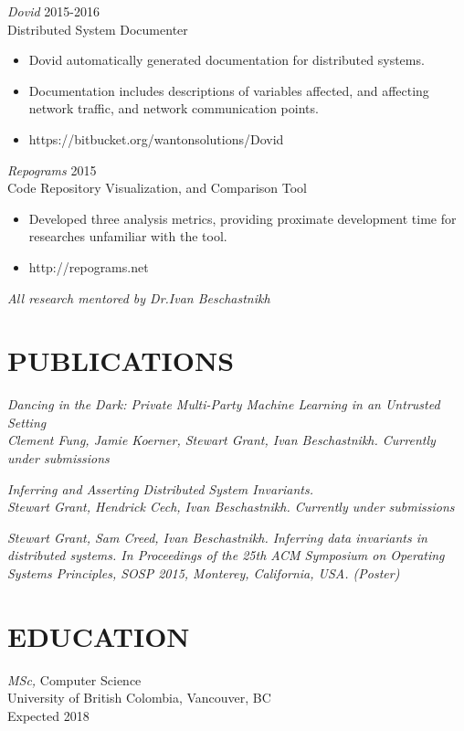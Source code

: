 \documentclass[line,margin]{res}
\begin{document}
\begin{resume}
{\sl Dovid} \hfill 2015-2016\\
    Distributed System Documenter
\begin{itemize} \itemsep -2pt
        \item Dovid automatically generated documentation for distributed systems.
        \item Documentation includes descriptions of variables affected, and affecting network traffic, and network communication points.
        \item https://bitbucket.org/wantonsolutions/Dovid
\end{itemize}

{\sl Repograms} \hfill 2015\\
	Code Repository Visualization, and Comparison Tool
\begin{itemize} \itemsep -2pt
        \item Developed three analysis metrics, providing proximate development time for researches unfamiliar with the tool.
		\item http://repograms.net
\end{itemize}

{\sl \textit{All research mentored by Dr.Ivan Beschastnikh}}\\




\section{PUBLICATIONS}

{\sl 
    Dancing in the Dark: Private Multi-Party Machine Learning in an Untrusted Setting \\
    Clement Fung, Jamie Koerner, Stewart Grant, Ivan Beschastnikh. 
    \it{Currently under submissions}}

{\sl 
    Inferring and Asserting Distributed System Invariants. \\
    Stewart Grant, Hendrick Cech, Ivan Beschastnikh. 
    \it{Currently under submissions}}

{\sl Stewart Grant, Sam Creed, Ivan Beschastnikh. Inferring data invariants in distributed systems. In \it{Proceedings of the 25th ACM Symposium on Operating Systems Principles, SOSP 2015}, Monterey, California, USA. (Poster)}

\section{EDUCATION}
{\sl MSc,} Computer Science\\
University of British Colombia, Vancouver, BC \\
Expected 2018


\end{resume}
\end{document}
